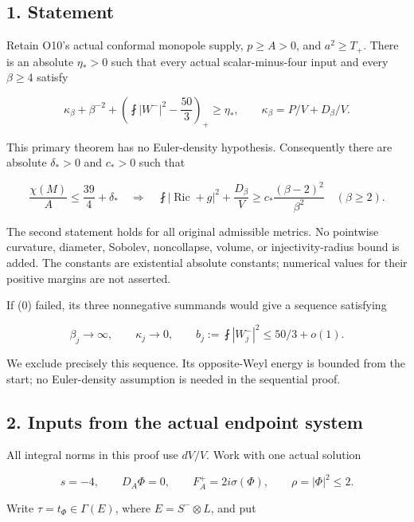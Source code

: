 \documentclass[11pt]{article}
\begin{document}
\hypertarget{o10strength:statement}{%
\subsection{1. Statement}\label{o10strength:statement}}

Retain O10's actual conformal monopole supply, \(p\ge A>0\), and
\(a^2\ge T_+\). There is an absolute \(\eta_*>0\) such that every actual
scalar-minus-four input and every \(\beta\ge4\) satisfy

\[
 \boxed{\kappa_\beta+\beta^{-2}+
 \left(\fint|W^-|^2-\frac{50}{3}\right)_+\ge\eta_*},
 \qquad \kappa_\beta=P/V+D_\beta/V.
\tag{0}
\]

This primary theorem has no Euler-density hypothesis. Consequently there
are absolute \(\delta_*>0\) and \(c_*>0\) such that

\[
 \frac{\chi(M)}A\le\frac{39}{4}+\delta_*
 \quad\Longrightarrow\quad
 \boxed{\fint|\operatorname{Ric}+g|^2+\frac{D_\beta}V
 \ge c_*\frac{(\beta-2)^2}{\beta^2}\quad(\beta\ge2)}.
\tag{1}
\]

The second statement holds for all original admissible metrics. No
pointwise curvature, diameter, Sobolev, noncollapse, volume, or
injectivity-radius bound is added. The constants are existential
absolute constants; numerical values for their positive margins are not
asserted.

If (0) failed, its three nonnegative summands would give a sequence
satisfying

\[
 \beta_j\to\infty,\qquad\kappa_j\to0,\qquad
 b_j:=\fint|W_j^-|^2\le50/3+o(1).
\tag{2a}
\]

We exclude precisely this sequence. Its opposite-Weyl energy is bounded
from the start; no Euler-density assumption is needed in the sequential
proof.

\hypertarget{o10strength:inputs-from-the-actual-endpoint-system}{%
\subsection{2. Inputs from the actual endpoint
system}\label{o10strength:inputs-from-the-actual-endpoint-system}}

All integral norms in this proof use \(dV/V\). Work with one actual
solution

\[
 s=-4,\qquad D_A\Phi=0,\qquad F_A^+=2i\sigma(\Phi),
 \qquad \rho=|\Phi|^2\le2.
\]

Write \(\tau=t_\Phi\in\Gamma(E)\), where \(E=S^-\otimes L\), and put
\end{document}
